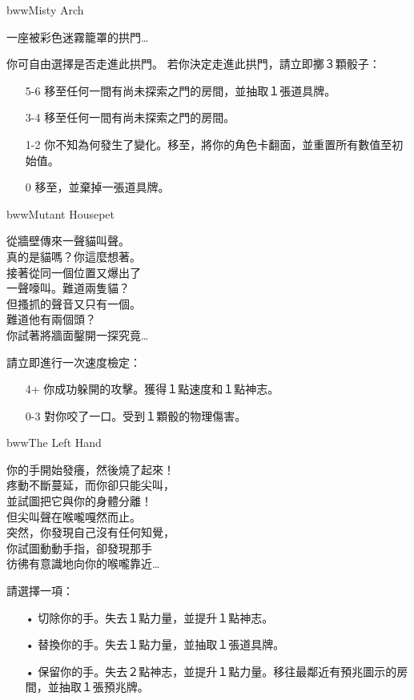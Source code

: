 \linebreak[0]%
\begin{EventCard}{bww}{Misty Arch}
  \begin{CardStory}
    一座被彩色迷霧籠罩的拱門…
  \end{CardStory}
  你可自由選擇是否走進此拱門。\smallbreak
  若你決定走進此拱門，請立即擲３顆骰子：
  \begin{itemize}
    \item[5-6] 移至任何一間有尚未探索之門的房間，並抽取１張道具牌。
    \item[3-4] 移至任何一間有尚未探索之門的房間。
    \item[1-2] 你不知為何發生了變化。移至，將你的角色卡翻面，並重置所有數值至初始值。
    \item[0] 移至，並棄掉一張道具牌。
  \end{itemize}
\end{EventCard}%
\linebreak[0]%
\begin{EventCard}{bww}{Mutant Housepet}
  \begin{CardStory}
    從牆壁傳來一聲貓叫聲。\\
    真的是貓嗎？你這麼想著。\\
    接著從同一個位置又爆出了\\
    一聲嚎叫。難道兩隻貓？\\
    但搔抓的聲音又只有一個。\\
    難道他有兩個頭？\\
    你試著將牆面鑿開一探究竟…
  \end{CardStory}
  請立即進行一次速度檢定：
  \begin{itemize}
    \item[4+] 你成功躲開\ThisName{}的攻擊。獲得１點速度和１點神志。
    \item[0-3] \ThisName{}對你咬了一口。受到１顆骰的物理傷害。
  \end{itemize}
\end{EventCard}%
\linebreak[0]%
\begin{EventCard}{bww}{The Left Hand}
  \begin{CardStory}
    你的手開始發癢，然後燒了起來！\\
    疼動不斷蔓延，而你卻只能尖叫，\\
    並試圖把它與你的身體分離！\\
    但尖叫聲在喉嚨嘎然而止。\\
    突然，你發現自己沒有任何知覺，\\
    你試圖動動手指，卻發現那手\\
    彷彿有意識地向你的喉嚨靠近…
  \end{CardStory}
  請選擇一項：
  \begin{itemize}
    \item[•] 切除你的手。失去１點力量，並提升１點神志。
    \item[•] 替換你的手。失去１點力量，並抽取１張道具牌。
    \item[•] 保留你的手。失去２點神志，並提升１點力量。移往最鄰近有預兆圖示的房間，並抽取１張預兆牌。
  \end{itemize}
\end{EventCard}%
